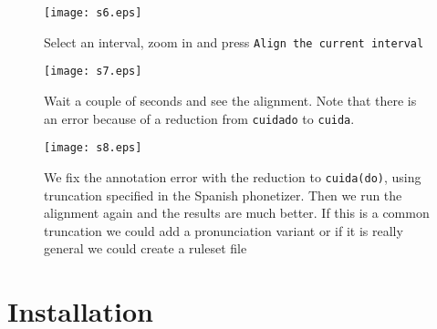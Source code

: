 \begin{figure}[H]
	\centering
	\texttt{[image: s6.eps]}
	\caption{Select an interval, zoom in and press
	\texttt{Align the current interval}}
\end{figure}

\begin{figure}[H]
	\centering
	\texttt{[image: s7.eps]}
	\caption{Wait a couple of seconds and see the alignment. Note that there is
an error because of a reduction from \texttt{cuidado} to \texttt{cuida}.}
\end{figure}

\begin{figure}[H]
	\centering
	\texttt{[image: s8.eps]}
	\caption{We fix the annotation error with the reduction to
\texttt{cuida(do)}, using truncation specified in the Spanish phonetizer. Then
we run the alignment again and the results are much better. If this is a common
truncation we could add a pronunciation variant or if it is really general we
could create a ruleset file}
\end{figure}

\chapter{Installation}
